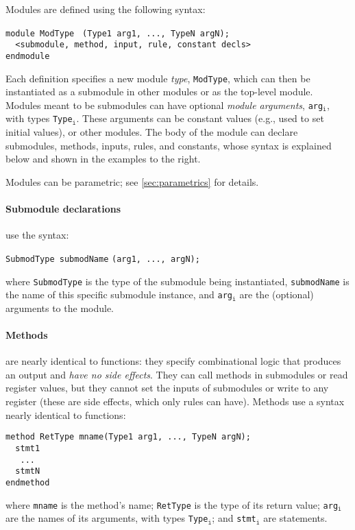 Modules are defined using the following syntax:
\begin{center}
\verb|module ModType | \optStart \verb|(Type1 arg1, ..., TypeN argN)|\optEnd\verb|;    | \\
\verb|  <submodule, method, input, rule, constant decls> | \\
\verb|endmodule                                          |
\end{center}
Each definition specifies a new module \emph{type}, \verb|ModType|,
which can then be instantiated as a submodule in other modules
or as the top-level module.
Modules meant to be submodules can have optional \emph{module arguments},
\verb|arg|$_{\texttt{i}}$, with types \verb|Type|$_{\texttt{i}}$.
These arguments can be constant values (e.g., used to set initial values),
or other modules.
The body of the module can declare submodules, methods, inputs, rules, and constants,
whose syntax is explained below and shown in the examples to the right.

Modules can be parametric; see \autoref{sec:parametrics} for details.

\paragraph{Submodule declarations} use the syntax:
\begin{center}
  \verb|SubmodType submodName| \optStart \verb|(arg1, ..., argN)|\optEnd\verb|;|
\end{center}
where \verb|SubmodType| is the type of the submodule being instantiated,
\verb|submodName| is the name of this specific submodule instance,
and \verb|arg|$_{\texttt{i}}$ are the (optional) arguments to the module.


\paragraph{Methods} 
are nearly identical to functions:
they specify combinational logic that produces an output
and \emph{have no side effects}.
They can call methods in submodules or read register values,
but they cannot set the inputs of submodules or write to any register
(these are side effects, which only rules can have).
Methods use a syntax nearly identical to functions:
\begin{center}
\verb|method RetType mname(Type1 arg1, ..., TypeN argN);| \\
\verb|  stmt1                                           | \\
\verb|   ...                                            | \\
\verb|  stmtN                                           | \\
\verb|endmethod                                         |
\end{center}
where \verb|mname| is the method's name;
\verb|RetType| is the type of its return value;
\verb|arg|$_{\texttt{i}}$ are the names of its arguments,
with types \verb|Type|$_{\texttt{i}}$;
and \verb|stmt|$_{\texttt{i}}$ are statements.

